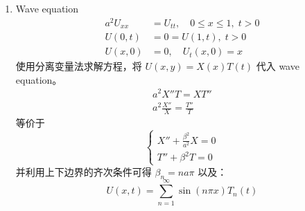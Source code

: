 \documentclass[a4paper]{article}
\begin{document}
\begin{enumerate}
\begin{equation*}
            \begin{cases}
                X'' + n^2\pi^2 X = 0 \\
                T' + kn^2\pi^2 T = 0
            \end{cases}
        \end{equation*}
        由边界条件易得 $X_n(x) = \sin(n\pi x)$，
        解的整体形式可以写为
        \begin{equation*}
            \tilde{U}(x, t) = \sum_{n=1}^{\infty} A_n \sin(n\pi x) e^{-kn^2\pi^2 t}
        \end{equation*}
        由初始条件 $\tilde{U}(x, 0) = -x$ 可得
        \begin{equation*}
            -x = \sum_{n=1}^{\infty} A_n \sin(n\pi x)
        \end{equation*}
        因而
        \begin{equation*}
            A_n = 2\int_0^1 (-x) \sin(n\pi x) \, dx
            = \frac{2}{n\pi}(-1)^n
        \end{equation*}
        最终得到
        \begin{equation*}
            U(x, t) = x + \sum_{n=1}^{\infty} \frac{2}{n\pi}(-1)^n \sin(n\pi x) e^{-kn^2\pi^2 t}
        \end{equation*}
    \item[(c)] Wave equation
        \begin{align*}
            a^2 U_{xx} &= U_{tt}, \quad 0 \leq x \leq 1, \; t > 0 \\
            U(0, t) &= 0 = U(1, t), \; t > 0 \\
            U(x, 0) &= 0, \quad U_t(x, 0) = x
        \end{align*}
        使用分离变量法求解方程，将 \(U(x, y) = X(x)T(t)\) 代入 wave equation。
        \begin{gather*}
            a^2 X''T = XT''\\
            a^2\frac{X''}{X} = \frac{T''}{T}
        \end{gather*}
        等价于
        \begin{equation*}
            \begin{cases}
                X'' + \frac{\beta^2}{a^2} X = 0 \\
                T'' + \beta^2 T = 0
            \end{cases}
        \end{equation*}
        并利用上下边界的齐次条件可得 $\beta_n = na\pi$ 以及：
        \begin{equation*}
            U(x,t)=\sum_{n=1}^{\infty}\sin\left(n\pi x\right)T_n(t)

\end{equation*}
\end{enumerate}
\end{document}
